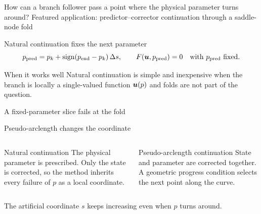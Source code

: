   {How can a branch follower pass a point where the physical parameter turns around?}
  {Featured application: predictor--corrector continuation through a saddle-node fold}

\begin{frame}{Natural continuation fixes the next parameter}
\[
  p_{\mathrm{pred}}
    =p_k+\operatorname{sign}(p_{\mathrm{end}}-p_k)\,\Delta s,
  \qquad
  F(\bm{u},p_{\mathrm{pred}})=0
  \quad\text{with $p_{\mathrm{pred}}$ fixed.}
\]
\begin{block}{When it works well}
Natural continuation is simple and inexpensive when the branch is locally a
single-valued function $\bm{u}(p)$ and folds are not part of the question.
\end{block}
\end{frame}

\begin{frame}{A fixed-parameter slice fails at the fold}
\centering
{}
\end{frame}

\begin{frame}{Pseudo-arclength changes the coordinate}
\begin{columns}[T,onlytextwidth]
\begin{alertblock}{Natural continuation}
The physical parameter is prescribed. Only the state is corrected, so the
method inherits every failure of $p$ as a local coordinate.
\end{alertblock}

\begin{block}{Pseudo-arclength continuation}
State and parameter are corrected together. A geometric progress condition
selects the next point along the curve.
\end{block}
\end{columns}

\vfill
\centering
The artificial coordinate $s$ keeps increasing even when $p$ turns around.
\end{frame}

